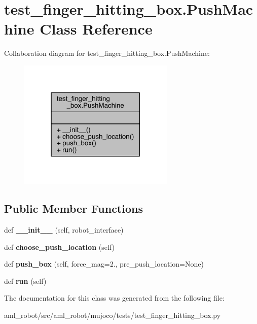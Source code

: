 \hypertarget{classtest__finger__hitting__box_1_1_push_machine}{}\section{test\+\_\+finger\+\_\+hitting\+\_\+box.\+Push\+Machine Class Reference}
\label{classtest__finger__hitting__box_1_1_push_machine}


Collaboration diagram for test\+\_\+finger\+\_\+hitting\+\_\+box.\+Push\+Machine\+:
\nopagebreak
\begin{figure}[H]
\begin{center}
\leavevmode
\includegraphics[width=211pt]{classtest__finger__hitting__box_1_1_push_machine__coll__graph}
\end{center}
\end{figure}
\subsection*{Public Member Functions}
\begin{DoxyCompactItemize}
\item 
\hypertarget{classtest__finger__hitting__box_1_1_push_machine_aa58906be56f5201a386d876c2b9856ed}{}\label{classtest__finger__hitting__box_1_1_push_machine_aa58906be56f5201a386d876c2b9856ed} 
def {\bfseries \+\_\+\+\_\+init\+\_\+\+\_\+} (self, robot\+\_\+interface)
\item 
\hypertarget{classtest__finger__hitting__box_1_1_push_machine_a8b88d9ed266d021b4228ad51b26a303c}{}\label{classtest__finger__hitting__box_1_1_push_machine_a8b88d9ed266d021b4228ad51b26a303c} 
def {\bfseries choose\+\_\+push\+\_\+location} (self)
\item 
\hypertarget{classtest__finger__hitting__box_1_1_push_machine_a25e4b9e093b8cb51b3948705ffaea39c}{}\label{classtest__finger__hitting__box_1_1_push_machine_a25e4b9e093b8cb51b3948705ffaea39c} 
def {\bfseries push\+\_\+box} (self, force\+\_\+mag=2., pre\+\_\+push\+\_\+location=None)
\item 
\hypertarget{classtest__finger__hitting__box_1_1_push_machine_a7f4c556206df679857fe4dd7130389d0}{}\label{classtest__finger__hitting__box_1_1_push_machine_a7f4c556206df679857fe4dd7130389d0} 
def {\bfseries run} (self)
\end{DoxyCompactItemize}


The documentation for this class was generated from the following file\+:\begin{DoxyCompactItemize}
\item 
aml\+\_\+robot/src/aml\+\_\+robot/mujoco/tests/test\+\_\+finger\+\_\+hitting\+\_\+box.\+py\end{DoxyCompactItemize}
